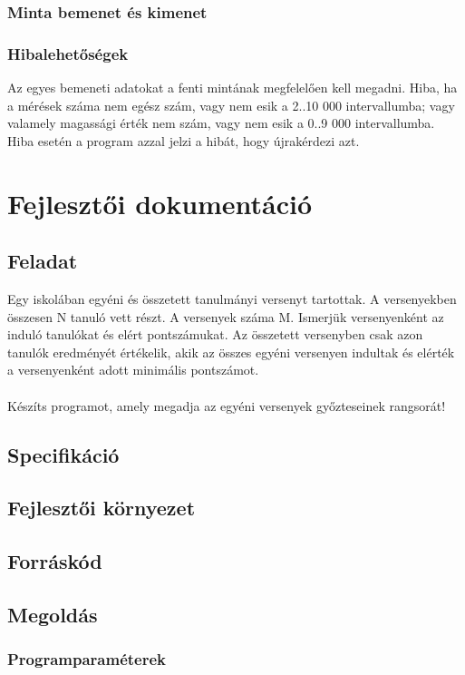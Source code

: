 \documentclass{article}
\begin{document}
      \subsubsection{Minta bemenet és kimenet}
      \subsubsection{Hibalehetőségek}
        Az egyes bemeneti adatokat a fenti mintának megfelelően kell megadni.
        Hiba, ha a mérések száma nem egész szám, vagy nem esik a 2..10 000 intervallumba;
        vagy valamely magassági érték nem szám, vagy nem esik a 0..9 000 intervallumba.
        Hiba esetén a program azzal jelzi a hibát, hogy újrakérdezi azt.

  \newpage

  \section{Fejlesztői dokumentáció}
    \subsection{Feladat}
      Egy iskolában egyéni és összetett tanulmányi versenyt tartottak. A versenyekben összesen N tanuló vett részt. A versenyek száma M. Ismerjük versenyenként az induló tanulókat és elért pontszámukat. Az összetett versenyben csak azon tanulók eredményét értékelik, akik az összes egyéni versenyen indultak és elérték a versenyenként adott minimális pontszámot.
      \\
      \\ Készíts programot, amely megadja az egyéni versenyek győzteseinek rangsorát!
    \subsection{Specifikáció}
    \subsection{Fejlesztői környezet}
    \subsection{Forráskód}
    \subsection{Megoldás}
      \subsubsection{Programparaméterek}
\end{document}
